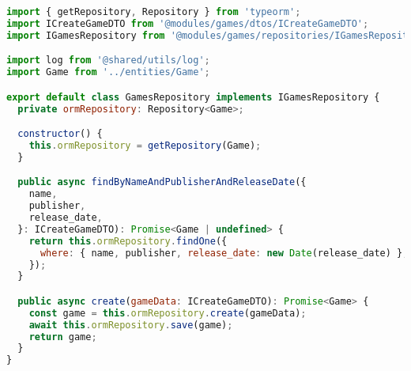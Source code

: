 \begin{lstlisting}[language=JavaScript, caption={GamesRepository.ts},captionpos=b, label=alg:gamerepository]
import { getRepository, Repository } from 'typeorm';
import ICreateGameDTO from '@modules/games/dtos/ICreateGameDTO';
import IGamesRepository from '@modules/games/repositories/IGamesRepository';

import log from '@shared/utils/log';
import Game from '../entities/Game';

export default class GamesRepository implements IGamesRepository {
  private ormRepository: Repository<Game>;

  constructor() {
    this.ormRepository = getRepository(Game);
  }

  public async findByNameAndPublisherAndReleaseDate({
    name,
    publisher,
    release_date,
  }: ICreateGameDTO): Promise<Game | undefined> {
    return this.ormRepository.findOne({
      where: { name, publisher, release_date: new Date(release_date) },
    });
  }

  public async create(gameData: ICreateGameDTO): Promise<Game> {
    const game = this.ormRepository.create(gameData);
    await this.ormRepository.save(game);
    return game;
  }
}

\end{lstlisting}